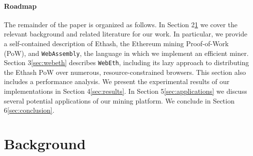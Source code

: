 \documentclass[runningheads]{llncs}
\begin{document}

\paragraph{Roadmap}
The remainder of the paper is organized as follows. In Section 2\ref{sec:background} we cover the relevant background and related literature for our work.  In particular, we provide a self-contained description of Ethash, the Ethereum mining Proof-of-Work (PoW), and \verb|WebAssembly|, the language in which we implement an efficient miner. Section 3\ref{sec:webeth} describes \verb|WebEth|, including its lazy approach to distributing the Ethash PoW over numerous, resource-constrained browsers. This section also includes a performance analysis. We present the experimental results of our implementations in Section 4\ref{sec:results}. In Section 5\ref{sec:applications} we discuss several potential applications of our mining platform. We conclude in Section 6\ref{sec:conclusion}.  

\section{Background}
\label{sec:background}
\end{document}
